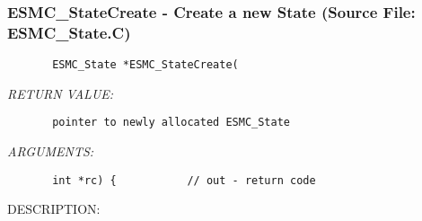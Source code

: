  
\parskip        0pt
\parindent      0pt
\baselineskip  11pt
 
\def\bv{\begin{verbatim}}
\def\ev{\end{verbatim}}
\def\be{\begin{equation}}
\def\ee{\end{equation}}
\def\bea{\begin{eqnarray}}
\def\eea{\end{eqnarray}}
\def\bi{\begin{itemize}}
\def\ei{\end{itemize}}
\def\bn{\begin{enumerate}}
\def\en{\end{enumerate}}
\def\bd{\begin{description}}
\def\ed{\end{description}}
\def\({\left (}
\def\){\right )}
\def\[{\left [}
\def\]{\right ]}
\def\<{\left  \langle}
\def\>{\right \rangle}
\def\cI{{\cal I}}
\def\diag{\mathop{\rm diag}}
\def\tr{\mathop{\rm tr}}


 
\subsubsection{ESMC\_StateCreate - Create a new State (Source File: ESMC\_State.C)}


  
\begin{verbatim}       ESMC_State *ESMC_StateCreate(\end{verbatim}{\em RETURN VALUE:}
\begin{verbatim}       pointer to newly allocated ESMC_State\end{verbatim}{\em ARGUMENTS:}
\begin{verbatim}       int *rc) {           // out - return code\end{verbatim}
{\sf DESCRIPTION:\\ }


